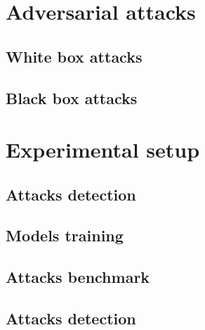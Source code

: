 \documentclass[10pt,twocolumn,letterpaper]{article}
\begin{document}
\section{Adversarial attacks}
\label{sec:attacks}

\subsection{White box attacks}

\paragraph{} 

\subsection{Black box attacks}

\paragraph{} 


\section{Experimental setup}
\label{sec:setup}

\subsection{Attacks detection}

\subsection{Models training}

\paragraph{} 

\subsection{Attacks benchmark}

\paragraph{} 

\subsection{Attacks detection}
\end{document}

